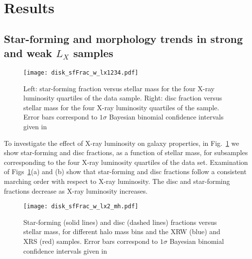 \section{Results}
\label{sec:results_x}

\subsection{Star-forming and morphology trends in strong and weak
  $L_X$ samples}

\begin{figure}[!ht]
  \centering
  \texttt{[image: disk\_sfFrac\_w\_lx1234.pdf]}
  \caption{Left: star-forming fraction versus stellar mass for the
    four X-ray luminosity quartiles of the data sample.  Right: disc
    fraction versus stellar mass for the four X-ray luminosity
    quartiles of the sample.  Error bars correspond to $1\sigma$
    Bayesian binomial confidence intervals given in \citet{cameron2011}}
  \label{fig:disk_sfFrac_w_lx1234}
\end{figure}

To investigate the effect of X-ray luminosity on galaxy properties, in
Fig.~\ref{fig:disk_sfFrac_w_lx1234} we show star-forming and disc
fractions, as a function of stellar mass, for subsamples corresponding
to the four X-ray luminosity quartiles of the data set.  Examination
of Figs~\ref{fig:disk_sfFrac_w_lx1234}(a) and (b) show that
star-forming and disc fractions follow a consistent marching order
with respect to X-ray luminosity.  The disc and star-forming fractions
decrease as X-ray luminosity increases.

\begin{figure}[!ht]
  \centering
  \texttt{[image: disk\_sfFrac\_w\_lx2\_mh.pdf]}
  \caption{Star-forming (solid lines) and disc (dashed lines)
    fractions versus stellar mass, for different halo mass bins and
    the XRW (blue) and XRS (red) samples.  Error bars correspond to
    $1\sigma$ Bayesian binomial confidence intervals given in \citet{cameron2011}}
  \label{fig:disk_sfFrac_w_lx2_mh}
\end{figure}

